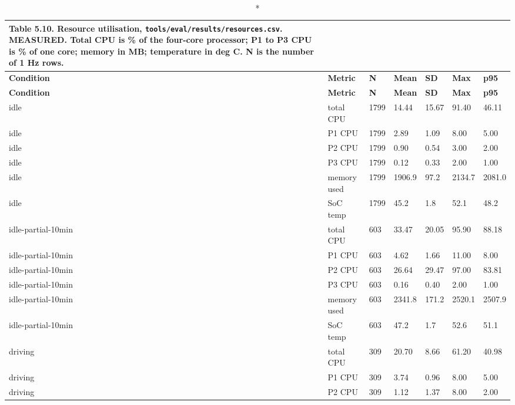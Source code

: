 \begin{center}
\footnotesize
\begin{longtable}{|p{3.5cm}|p{2.3cm}|l|l|l|l|l|}
\caption*{Table 5.10. Resource utilisation, \texttt{tools/eval/results/resources.csv}. MEASURED. Total CPU is \% of the four-core processor; P1 to P3 CPU is \% of one core; memory in MB; temperature in deg C. N is the number of 1 Hz rows.}
\addcontentsline{lot}{table}{\protect\numberline{5.10}Resource utilisation, \texttt{tools/eval/results/resources.csv}. MEASURED. Total CPU is \% of the four-core processor; P1 to P3 CPU is \% of one core; memory in MB; temperature in deg C. N is the number of 1 Hz rows.}
\\
\hline
\textbf{Condition} & \textbf{Metric} & \textbf{N} & \textbf{Mean} & \textbf{SD} & \textbf{Max} & \textbf{p95} \\
\hline
\endfirsthead
\hline
\textbf{Condition} & \textbf{Metric} & \textbf{N} & \textbf{Mean} & \textbf{SD} & \textbf{Max} & \textbf{p95} \\
\hline
\endhead
idle & total CPU & 1799 & 14.44 & 15.67 & 91.40 & 46.11 \\
\hline
idle & P1 CPU & 1799 & 2.89 & 1.09 & 8.00 & 5.00 \\
\hline
idle & P2 CPU & 1799 & 0.90 & 0.54 & 3.00 & 2.00 \\
\hline
idle & P3 CPU & 1799 & 0.12 & 0.33 & 2.00 & 1.00 \\
\hline
idle & memory used & 1799 & 1906.9 & 97.2 & 2134.7 & 2081.0 \\
\hline
idle & SoC temp & 1799 & 45.2 & 1.8 & 52.1 & 48.2 \\
\hline
idle-partial-10min & total CPU & 603 & 33.47 & 20.05 & 95.90 & 88.18 \\
\hline
idle-partial-10min & P1 CPU & 603 & 4.62 & 1.66 & 11.00 & 8.00 \\
\hline
idle-partial-10min & P2 CPU & 603 & 26.64 & 29.47 & 97.00 & 83.81 \\
\hline
idle-partial-10min & P3 CPU & 603 & 0.16 & 0.40 & 2.00 & 1.00 \\
\hline
idle-partial-10min & memory used & 603 & 2341.8 & 171.2 & 2520.1 & 2507.9 \\
\hline
idle-partial-10min & SoC temp & 603 & 47.2 & 1.7 & 52.6 & 51.1 \\
\hline
driving & total CPU & 309 & 20.70 & 8.66 & 61.20 & 40.98 \\
\hline
driving & P1 CPU & 309 & 3.74 & 0.96 & 8.00 & 5.00 \\
\hline
driving & P2 CPU & 309 & 1.12 & 1.37 & 8.00 & 2.00 \\

\end{longtable}
\end{center}
